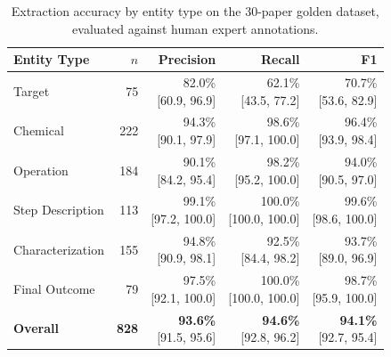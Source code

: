 \documentclass[12pt,a4paper]{article}
\begin{document}

\begin{table}[htbp]
\centering
\caption{Extraction accuracy by entity type on the 30-paper golden dataset, evaluated against human expert annotations.}
\label{tab:prf_entity_type}
\begin{tabular}{lrrrr}
\toprule
Entity Type & $n$ & Precision & Recall & F1 \\
\midrule
  Target & 75 & \makecell{82.0\%\\\footnotesize{[60.9, 96.9]}} & \makecell{62.1\%\\\footnotesize{[43.5, 77.2]}} & \makecell{70.7\%\\\footnotesize{[53.6, 82.9]}} \\
  Chemical & 222 & \makecell{94.3\%\\\footnotesize{[90.1, 97.9]}} & \makecell{98.6\%\\\footnotesize{[97.1, 100.0]}} & \makecell{96.4\%\\\footnotesize{[93.9, 98.4]}} \\
  Operation & 184 & \makecell{90.1\%\\\footnotesize{[84.2, 95.4]}} & \makecell{98.2\%\\\footnotesize{[95.2, 100.0]}} & \makecell{94.0\%\\\footnotesize{[90.5, 97.0]}} \\
  Step Description & 113 & \makecell{99.1\%\\\footnotesize{[97.2, 100.0]}} & \makecell{100.0\%\\\footnotesize{[100.0, 100.0]}} & \makecell{99.6\%\\\footnotesize{[98.6, 100.0]}} \\
  Characterization & 155 & \makecell{94.8\%\\\footnotesize{[90.9, 98.1]}} & \makecell{92.5\%\\\footnotesize{[84.4, 98.2]}} & \makecell{93.7\%\\\footnotesize{[89.0, 96.9]}} \\
  Final Outcome & 79 & \makecell{97.5\%\\\footnotesize{[92.1, 100.0]}} & \makecell{100.0\%\\\footnotesize{[100.0, 100.0]}} & \makecell{98.7\%\\\footnotesize{[95.9, 100.0]}} \\
\midrule
  \textbf{Overall} & \textbf{828} & \makecell{\textbf{93.6\%}\\\footnotesize{[91.5, 95.6]}} & \makecell{\textbf{94.6\%}\\\footnotesize{[92.8, 96.2]}} & \makecell{\textbf{94.1\%}\\\footnotesize{[92.7, 95.4]}} \\
\bottomrule
\end{tabular}
\end{table}
\end{document}
